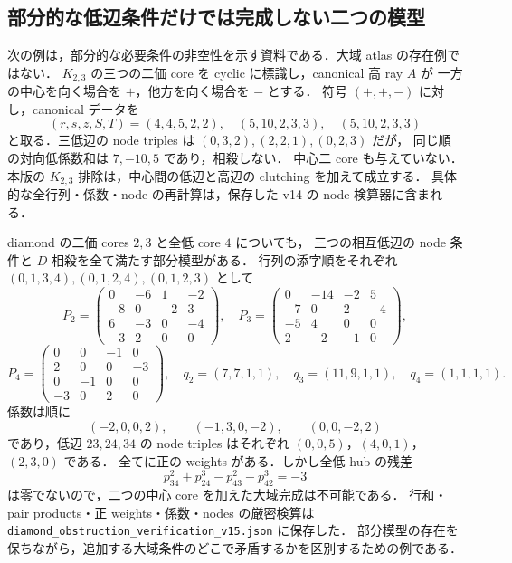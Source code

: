 \subsection{部分的な低辺条件だけでは完成しない二つの模型}
\label{ng16:partial-patches}

次の例は，部分的な必要条件の非空性を示す資料である．大域 atlas の存在例ではない．
$K_{2,3}$ の三つの二価 core を cyclic に標識し，canonical 高 ray $A$ が
一方の中心を向く場合を $+$，他方を向く場合を $-$ とする．
符号 $(+,+,-)$ に対し，canonical データを
\[
 (r,s,z,S,T)=(4,4,5,2,2),\quad(5,10,2,3,3),\quad(5,10,2,3,3)
\]
と取る．三低辺の node triples は $(0,3,2),(2,2,1),(0,2,3)$ だが，
同じ順の対向低係数和は $7,-10,5$ であり，相殺しない．
中心二 core も与えていない．本版の $K_{2,3}$ 排除は，中心間の低辺と高辺の clutching を加えて成立する．
具体的な全行列・係数・node の再計算は，保存した v14 の node 検算器に含まれる．

diamond の二価 cores $2,3$ と全低 core $4$ についても，
三つの相互低辺の node 条件と $D$ 相殺を全て満たす部分模型がある．
行列の添字順をそれぞれ $(0,1,3,4),(0,1,2,4),(0,1,2,3)$ として
\[
 P_2=\begin{pmatrix}0&-6&1&-2\\-8&0&-2&3\\6&-3&0&-4\\-3&2&0&0\end{pmatrix},\quad
 P_3=\begin{pmatrix}0&-14&-2&5\\-7&0&2&-4\\-5&4&0&0\\2&-2&-1&0\end{pmatrix},
\]
\[
 P_4=\begin{pmatrix}0&0&-1&0\\2&0&0&-3\\0&-1&0&0\\-3&0&2&0\end{pmatrix},
 \quad q_2=(7,7,1,1),\quad q_3=(11,9,1,1),\quad q_4=(1,1,1,1).
\]
係数は順に
\[
 (-2,0,0,2),\qquad(-1,3,0,-2),\qquad(0,0,-2,2)
\]
であり，低辺 $23,24,34$ の node triples はそれぞれ
$(0,0,5)$，$(4,0,1)$，$(2,3,0)$ である．
全てに正の weights がある．しかし全低 hub の残差
\[
 p^2_{34}+p^3_{24}-p^2_{43}-p^3_{42}=-3
\]
は零でないので，二つの中心 core を加えた大域完成は不可能である．
行和・pair products・正 weights・係数・nodes の厳密検算は
\nolinkurl{diamond_obstruction_verification_v15.json} に保存した．
部分模型の存在を保ちながら，追加する大域条件のどこで矛盾するかを区別するための例である．
